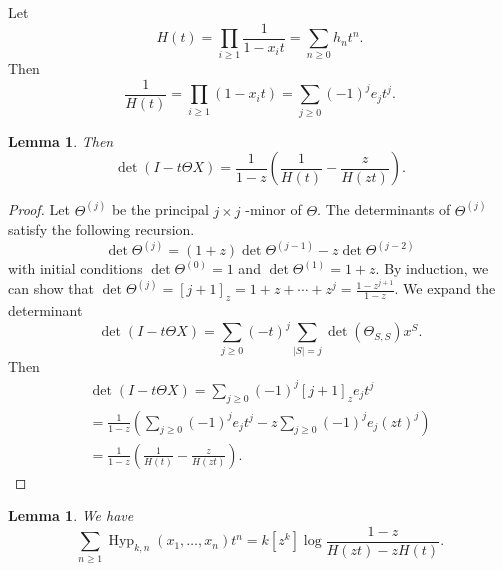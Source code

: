 \documentclass[10pt,a4paper]{amsart}
\theoremstyle{plain}
\newtheorem{lemma}[theorem]{Lemma}
\theoremstyle{definition}
\DeclareMathOperator{\Hyp}{Hyp}
\begin{document}
Let
\begin{equation}
	H(t) = \prod_{i \geq 1} \frac{1}{1 - x_i t} = \sum_{n \geq 0} h_n t^n.
\end{equation}
Then
\begin{equation}
	\frac{1}{H(t)} = \prod_{i \geq 1} (1-x_i t) = \sum_{j \geq 0} (-1)^j e_j t^j.
\end{equation}

\begin{lemma}\label{lem:detI-t}
	Then
	\begin{equation}
		\det(I - t \Theta X) = \frac{1}{1-z} \left( \frac{1}{H(t)} - \frac{z}{H(zt)} \right).
	\end{equation}
\end{lemma}

\begin{proof}
	Let $ \Theta^{(j)} $ be the principal $ j \times j $ -minor of $ \Theta $. The determinants of $ \Theta^{(j)} $
	satisfy the following recursion.
	\begin{equation}
		\det \Theta^{(j)} = (1+z) \det \Theta^{(j-1)} - z \det \Theta^{(j-2)}
	\end{equation}
	with initial conditions $
		\det \Theta^{(0)} = 1 $ and $
		\det \Theta^{(1)} = 1+z $.
	By induction, we can show that $
		\det \Theta^{(j)} = [j+1]_z = 1 + z + \cdots + z^j = \frac{1 - z^{j+1}}{1-z} $.
	We expand the determinant
	\begin{equation}
		\det(I - t\Theta X) = \sum_{j \geq 0} (-t)^j \sum_{|S|=j} \det(\Theta_{S,S}) x^S.
	\end{equation}
	Then
	\begin{multline}
		\det(I - t\Theta X) = \sum_{j \geq 0} (-1)^j [j+1]_z e_j t^j \\= \frac{1}{1-z} \left( \sum_{j \geq 0} (-1)^j e_j t^j - z \sum_{j \geq 0} (-1)^j e_j (zt)^j \right) \\= \frac{1}{1-z}\left(\frac{1}{H(t)} - \frac{z}{H(zt)}\right).
	\end{multline}
\end{proof}

\begin{lemma}
	We have
	\begin{equation}
		\sum_{n \geq 1} \Hyp_{k,n}(x_1,\dots,x_n)t^n = k [z^k] \log \frac{1-z}{H(zt) - z H(t)}.
	\end{equation}
\end{lemma}
\end{document}
